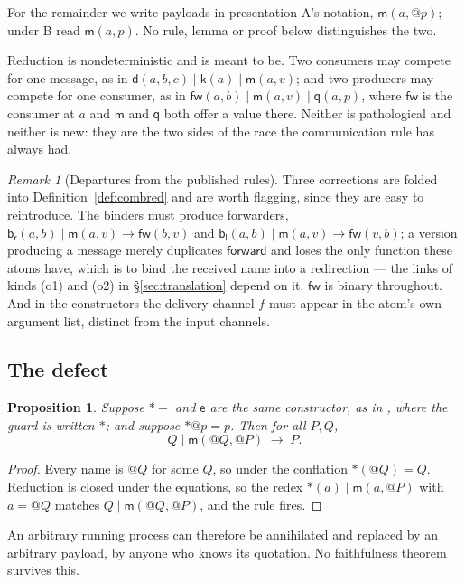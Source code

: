 \documentclass[11pt]{article}
\makeatletter
\theoremstyle{plain}
\newtheorem{proposition}[theorem]{Proposition}
\theoremstyle{definition}
\theoremstyle{remark}
\newtheorem{remark}[theorem]{Remark}
\newcommand{\quo}[1]{@#1}
\newcommand{\drp}[1]{{*}#1}
\newcommand{\mm}{\mathsf{m}}
\newcommand{\dd}{\mathsf{d}}
\newcommand{\kk}{\mathsf{k}}
\newcommand{\fw}{\mathsf{fw}}
\newcommand{\bl}{\mathsf{b}_{\mathsf{l}}}
\newcommand{\br}{\mathsf{b}_{\mathsf{r}}}
\newcommand{\ev}{\mathsf{e}}
\newcommand{\qq}{\mathsf{q}}
\newcommand{\red}{\longrightarrow}
\makeatother
\begin{document}
For the remainder we write payloads in presentation A's notation,
$\mm(a,\quo{p})$; under B read $\mm(a,p)$. No rule, lemma or proof below
distinguishes the two.

Reduction is nondeterministic and is meant to be. Two consumers may compete
for one message, as in $\dd(a,b,c) \mid \kk(a) \mid \mm(a,v)$; and two
producers may compete for one consumer, as in
$\fw(a,b) \mid \mm(a,v) \mid \qq(a,p)$, where $\fw$ is the consumer at $a$
and $\mm$ and $\qq$ both offer a value there. Neither is pathological and
neither is new: they are the two sides of the race the communication rule has
always had.

\begin{remark}[Departures from the published rules]
\label{rem:departures}
Three corrections are folded into Definition~\ref{def:combred} and are worth
flagging, since they are easy to reintroduce. The binders must produce
forwarders, $\br(a,b) \mid \mm(a,v) \red \fw(b,v)$ and
$\bl(a,b) \mid \mm(a,v) \red \fw(v,b)$; a version producing a message merely
duplicates $\mathsf{forward}$ and loses the only function these atoms have,
which is to bind the received name into a redirection --- the links of kinds
(o1) and (o2) in \S\ref{sec:translation} depend on it. $\fw$ is binary
throughout. And in the constructors the delivery channel $f$ must appear in
the atom's own argument list, distinct from the input channels.
\end{remark}

\subsection{The defect}
\label{sec:defect}

\begin{proposition}
\label{prop:defect}
Suppose $\drp{-}$ and $\ev$ are the same constructor, as in \cite{rhocomb},
where the guard is written $\mathsf{*}$; and suppose
$\drp{\quo{p}} = p$. Then for all $P,Q$,
\[
  Q \mid \mm(\quo{Q},\quo{P}) \;\red\; P.
\]
\end{proposition}

\begin{proof}
Every name is $\quo{Q}$ for some $Q$, so under the conflation
$\mathsf{*}(\quo{Q}) = Q$. Reduction is closed under the equations, so the
redex $\mathsf{*}(a) \mid \mm(a,\quo{P})$ with $a = \quo{Q}$ matches
$Q \mid \mm(\quo{Q},\quo{P})$, and the rule fires.
\end{proof}

An arbitrary running process can therefore be annihilated and replaced by an
arbitrary payload, by anyone who knows its quotation. No faithfulness theorem
survives this.
\end{document}
